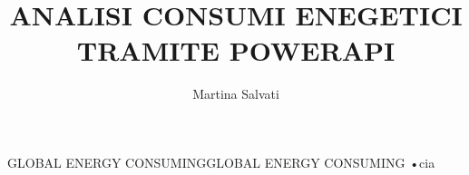 \documentclass[10pt,a4paper]{article}
\author{Martina Salvati}
\title{ANALISI CONSUMI ENEGETICI TRAMITE POWERAPI}
\begin{document}
GLOBAL ENERGY CONSUMINGGLOBAL ENERGY CONSUMING
•cia
\end{document}
